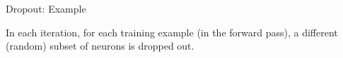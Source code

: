 \begin{frame}{Dropout: Example}
\begin{figure}
\centering
{}
\end{figure}
In each iteration, for each training example (in the forward pass), a different (random) subset of neurons is dropped out.
\end{frame}

